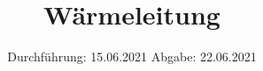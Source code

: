 

\subject{V204}
\title{Wärmeleitung}
\date{%
  Durchführung: 15.06.2021
  \hspace{3em}
  Abgabe: 22.06.2021
}



\maketitle
\thispagestyle{empty}
\tableofcontents
\newpage






\printbibliography{}


